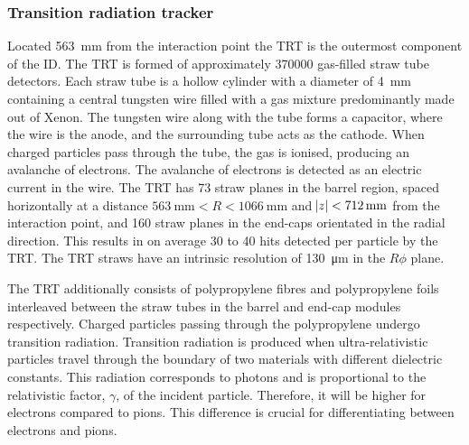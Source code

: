 \subsubsection{Transition radiation tracker}
Located \SI{563}{\milli\meter} from the interaction point the TRT is the outermost component of the ID. The TRT is formed of approximately 370000 gas-filled straw tube detectors. Each straw tube is a hollow cylinder with a diameter of \SI{4}{\milli\meter} containing a central tungsten wire filled with a gas mixture predominantly made out of Xenon. The tungsten wire along with the tube forms a capacitor, where the wire is the anode, and the surrounding tube acts as the cathode. When charged particles pass through the tube, the gas is ionised, producing an avalanche of electrons. The avalanche of electrons is detected as an electric current in the wire. The TRT has 73 straw planes in the barrel region, spaced horizontally at a distance $\SI{563}{\milli\meter} < R < \SI{1066}{\milli\meter}$ and $\abs{z} < \SI{712}{\milli\meter}$ from the interaction point, and 160 straw planes in the end-caps orientated in the radial direction. This results in on average 30 to 40 hits detected per particle by the TRT. The TRT straws have an intrinsic resolution of \SI{130}{\micro\meter} in the $R\phi$ plane. 

The TRT additionally consists of polypropylene fibres and polypropylene foils interleaved between the straw tubes in the barrel and end-cap modules respectively. Charged particles passing through the polypropylene undergo transition radiation. Transition radiation is produced when ultra-relativistic particles travel through the boundary of two materials with different dielectric constants. This radiation corresponds to photons and is proportional to the relativistic factor, $\gamma$, of the incident particle. Therefore, it will be higher for electrons compared to pions. This difference is crucial for differentiating between electrons and pions. 



